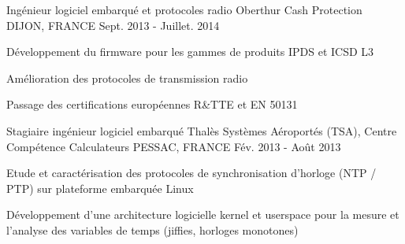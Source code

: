 \begin{cventries}
  \cventry
    {Ingénieur logiciel embarqué et protocoles radio} %
    {Oberthur Cash Protection} %
    {DIJON, FRANCE} %
    {Sept. 2013 - Juillet. 2014} %
    {
      \begin{cvitems} %
      \item {Développement du firmware pour les gammes de produits IPDS et ICSD L3}
      \item {Amélioration des protocoles de transmission radio}
      \item {Passage des certifications européennes R\&TTE et EN 50131}
      \end{cvitems}
    }


  \cventry
    {Stagiaire ingénieur logiciel embarqué} %
    {Thalès Systèmes Aéroportés (TSA), Centre Compétence Calculateurs} %
    {PESSAC, FRANCE} %
    {Fév. 2013 - Août 2013} %
    {
      \begin{cvitems} %
      \item {Etude et caractérisation des protocoles de synchronisation d'horloge (NTP / PTP) sur plateforme embarquée Linux}
        \item {Développement d'une architecture logicielle kernel et userspace pour la mesure et l'analyse des variables de temps (jiffies, horloges monotones)}
      \end{cvitems}
    }


\end{cventries}
